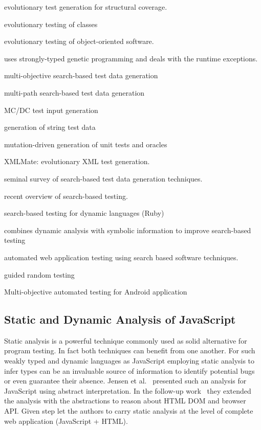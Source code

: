 \documentclass[sigconf]{acmart}
\begin{document}
\cite{wegener2001evolutionary} evolutionary test generation for structural coverage.

\cite{tonella2004evolutionary} evolutionary testing of classes

\cite{wappler2005using} evolutionary testing of object-oriented software.

\cite{wappler2006evolutionary} uses strongly-typed genetic programming and deals with the runtime exceptions.

\cite{lakhotia2007multi} multi-objective search-based test data generation 

\cite{cao2009search} multi-path search-based test data generation

\cite{awedikian2009mc} MC/DC test input generation 

\cite{shahbazi2016black} generation of string test data

\cite{fraser2012mutation} mutation-driven generation of unit tests and oracles

\cite{havrikov2014xmlmate} XMLMate: evolutionary XML test generation.

\cite{mcminn2004search} seminal survey of search-based test data generation techniques.

\cite{mcminn2011search} recent overview of search-based testing.

\cite{mairhofer2011search} search-based testing for dynamic languages (Ruby)

\cite{baars2011symbolic} combines dynamic analysis with symbolic information to improve search-based testing

\cite{alshahwan2011automated} automated web application testing using search based software techniques.

\cite{ma2015grt} guided random testing

\cite{mao2016sapienz} Multi-objective automated testing for Android application

\subsection{Static and Dynamic Analysis of JavaScript}
\label{sub.sec.js.static.anal}

Static analysis is a powerful technique commonly used as solid alternative for program testing. In fact both techniques can benefit from one another. For such weakly typed and dynamic languages as JavaScript employing static analysis to infer types can be an invaluable source of information to identify potential bugs or even guarantee their absence. Jensen et al.~\cite{tajs2009} presented such an analysis for JavaScript using abstract interpretation. In the follow-up work~\cite{dom2011} they extended the analysis with the abstractions to reason about HTML DOM and browser API. Given step let the authors to carry static analysis at the level of complete web application (JavaScript + HTML).
\cite{jquery2014}
\end{document}

